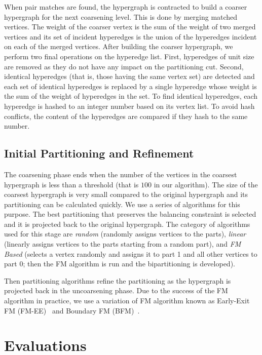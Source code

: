 \documentclass[twocolumn]{svjour3}          \smartqed
\begin{document}
When pair matches are found, the hypergraph is contracted to build a coarser hypergraph for the next coarsening level. This is done by merging matched vertices. The weight of the coarser vertex is the sum of the weight of two merged vertices and its set of incident hyperedges is the union of the hyperedges incident on each of the merged vertices. After building the coarser hypergraph, we perform two final operations on the hyperedge list. First, hyperedges of unit size are removed as they do not have any impact on the partitioning cut.  Second, identical hyperedges (that is, those having the same vertex set) are detected and each set of identical hyperedges is replaced by a single hyperedge whose weight is the sum of the weight of hyperedges in the set. To find identical hyperedges, each hyperedge is hashed to an integer number based on its vertex list.  To avoid hash conflicts, the content of the hyperedges are compared if they hash to the same number. 

\subsection{Initial Partitioning and Refinement}\label{sec:init_uncoarse}

The coarsening phase ends when the number of the vertices in the coarsest hypergraph is less than a threshold (that is $100$ in our algorithm). The size of the coarsest hypergraph is very small compared to the original hypergraph and its partitioning can be calculated quickly. We use a series of algorithms for this purpose. The best partitioning that preserves the balancing constraint is selected and it is projected back to the original hypergraph. The category of algorithms used for this stage are \textit{random} (randomly assigns vertices to the parts), \textit{linear} (linearly assigns vertices to the parts starting from a random part), and \textit{FM Based} (selects a vertex randomly and assigns it to part 1 and all other vertices to part 0; then the FM algorithm is run and the bipartitioning is developed).

Then partitioning algorithms refine the partitioning as the hypergraph is projected back in the uncoarsening phase. Due to the success of the FM algorithm in practice, we use a variation of FM algorithm known as Early-Exit FM (FM-EE)~\cite{karytech2002} and Boundary FM (BFM)~\cite{ccatalyurek2011patoh}. 


\section{Evaluations}\label{sec:evaluations}
\end{document}
